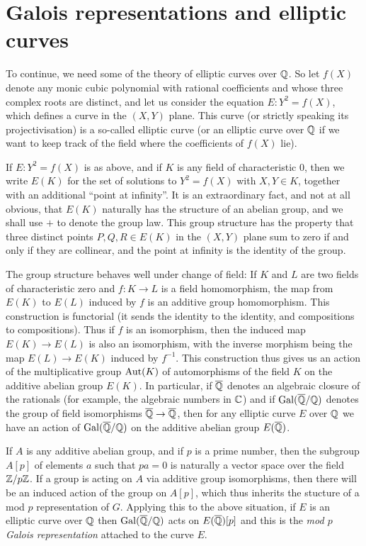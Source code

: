 \section{Galois representations and elliptic curves}

To continue, we need some of the theory of elliptic curves over $\mathbb{Q}$. So let $f(X)$ denote any monic cubic polynomial with rational coefficients and whose three complex roots are distinct, and let us consider the equation $E:Y^2=f(X)$, which defines a curve in the $(X,Y)$ plane. This curve (or strictly speaking its projectivisation) is a so-called elliptic curve (or an elliptic curve over $\mathbb{Q}$ if we want to keep track of the field where the coefficients of $f(X)$ lie). 

If $E:Y^2=f(X)$ is as above, and if $K$ is any field of characteristic 0, then we write $E(K)$ for the set of solutions to $Y^2=f(X)$ with $X,Y\in K$, together with an additional ``point at infinity''. It is an extraordinary fact, and not at all obvious, that $E(K)$ naturally has the structure of an abelian group, and we shall use $+$ to denote the group law. This group structure has the property that three distinct points $P,Q,R\in E(K)$ in the $(X,Y)$ plane sum to zero if and only if they are collinear, and the point at infinity is the identity of the group.

The group structure behaves well under change of field: If $K$ and $L$ are two fields of characteristic zero and $f:K\to L$ is a field homomorphism, the map from $E(K)$ to $E(L)$ induced by $f$ is an additive group homomorphism. This construction is functorial (it sends the identity to the identity, and compositions to compositions). Thus if $f$ is an isomorphism, then the induced map $E(K)\to E(L)$ is also an isomorphism, with the inverse morphism being the map $E(L)\to E(K)$ induced by $f^{-1}$. This construction thus gives us an action of the multiplicative group $\operatorname{Aut}(K)$ of automorphisms of the field $K$ on the additive abelian group $E(K)$. In particular, if $\overline{\mathbb{Q}}$ denotes an algebraic closure of the rationals (for example, the algebraic numbers in $\mathbb{C}$) and if $\operatorname{Gal}(\overline{\mathbb{Q}}/\mathbb{Q})$ denotes the group of field isomorphisms $\overline{\mathbb{Q}}\to\overline{\mathbb{Q}}$, then for any elliptic curve $E$ over $\mathbb{Q}$ we have an action of $\operatorname{Gal}(\overline{\mathbb{Q}}/\mathbb{Q})$ on the additive abelian group $E(\overline{\mathbb{Q}})$.

If $A$ is any additive abelian group, and if $p$ is a prime number, then the subgroup $A[p]$ of elements $a$ such that $pa=0$ is naturally a vector space over the field $\mathbb{Z}/p\mathbb{Z}$. If a group is acting on $A$ via additive group isomorphisms, then there will be an induced action of the group on $A[p]$, which thus inherits the stucture of a mod $p$ representation of $G$. Applying this to the above situation,
if $E$ is an elliptic curve over $\mathbb{Q}$ then $\operatorname{Gal}(\overline{\mathbb{Q}}/\mathbb{Q})$ acts on $E(\overline{\mathbb{Q}})[p]$ and this is the \emph{mod $p$ Galois representation} attached to
the curve $E$.

